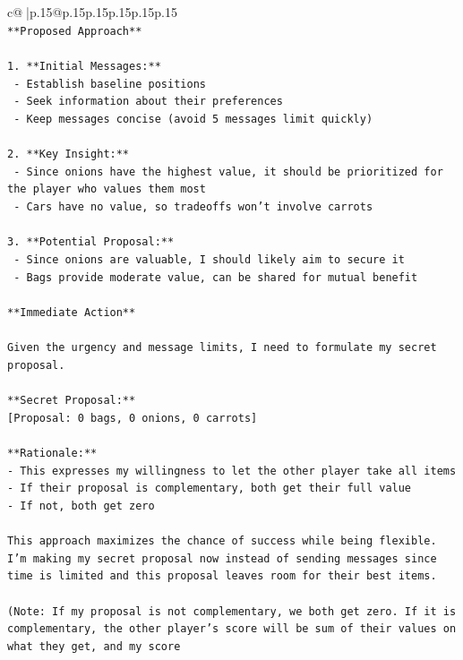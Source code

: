 \documentclass{article}
\begin{document}
{\begin{supertabular}{c@{$\;$}|p{.15\linewidth}@{}p{.15\linewidth}p{.15\linewidth}p{.15\linewidth}p{.15\linewidth}p{.15\linewidth}}
{{{\\ 
\texttt{**Proposed Approach**} \\
\\ 
\texttt{1. **Initial Messages:**} \\
\texttt{   {-} Establish baseline positions} \\
\texttt{   {-} Seek information about their preferences} \\
\texttt{   {-} Keep messages concise (avoid 5 messages limit quickly)} \\
\\ 
\texttt{2. **Key Insight:**} \\
\texttt{   {-} Since onions have the highest value, it should be prioritized for the player who values them most} \\
\texttt{   {-} Cars have no value, so tradeoffs won't involve carrots} \\
\\ 
\texttt{3. **Potential Proposal:**} \\
\texttt{   {-} Since onions are valuable, I should likely aim to secure it} \\
\texttt{   {-} Bags provide moderate value, can be shared for mutual benefit} \\
\\ 
\texttt{**Immediate Action**} \\
\\ 
\texttt{Given the urgency and message limits, I need to formulate my secret proposal. } \\
\\ 
\texttt{**Secret Proposal:**} \\
\texttt{{[}Proposal: 0 bags, 0 onions, 0 carrots{]}} \\
\\ 
\texttt{**Rationale:**} \\
\texttt{{-} This expresses my willingness to let the other player take all items} \\
\texttt{{-} If their proposal is complementary, both get their full value} \\
\texttt{{-} If not, both get zero } \\
\\ 
\texttt{This approach maximizes the chance of success while being flexible. I'm making my secret proposal now instead of sending messages since time is limited and this proposal leaves room for their best items.} \\
\\ 
\texttt{(Note: If my proposal is not complementary, we both get zero. If it is complementary, the other player's score will be sum of their values on what they get, and my score} \\
            }
        }
    }
     \\ \\


\end{supertabular}}
\end{document}
